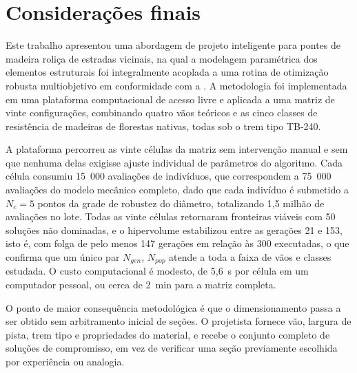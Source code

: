 \section{Considerações finais}\label{sec:conclusoes}

Este trabalho apresentou uma abordagem de projeto inteligente para pontes de madeira roliça de estradas vicinais, na qual a modelagem paramétrica dos elementos estruturais foi integralmente acoplada a uma rotina de otimização robusta multiobjetivo em conformidade com a \textcite{NBR7190-1:2022}.
A metodologia foi implementada em uma plataforma computacional de acesso livre e aplicada a uma matriz de vinte configurações, combinando quatro vãos teóricos e as cinco classes de resistência de madeiras de florestas nativas, todas sob o trem tipo TB-240.

A plataforma percorreu as vinte células da matriz sem intervenção manual e sem que nenhuma delas exigisse ajuste individual de parâmetros do algoritmo.
Cada célula consumiu 15~000 avaliações de indivíduos, que correspondem a 75~000 avaliações do modelo mecânico completo, dado que cada indivíduo é submetido a $N_c = 5$ pontos da grade de robustez do diâmetro, totalizando 1{,}5 milhão de avaliações no lote.
Todas as vinte células retornaram fronteiras viáveis com 50 soluções não dominadas, e o hipervolume estabilizou entre as gerações 21 e 153, isto é, com folga de pelo menos 147 gerações em relação às 300 executadas, o que confirma que um único par $N_{gen}$, $N_{pop}$ atende a toda a faixa de vãos e classes estudada.
O custo computacional é modesto, de 5{,}6~s por célula em um computador pessoal, ou cerca de 2~min para a matriz completa.

O ponto de maior consequência metodológica é que o dimensionamento passa a ser obtido sem arbitramento inicial de seções. O projetista fornece vão, largura de pista, trem tipo e propriedades do material, e recebe o conjunto completo de soluções de compromisso, em vez de verificar uma seção previamente escolhida por experiência ou analogia.

